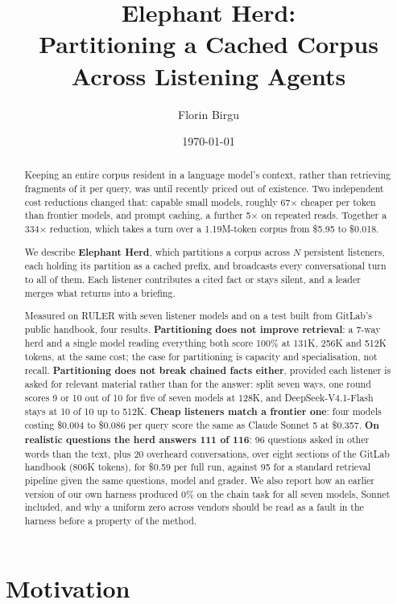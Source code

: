 \documentclass[11pt]{article}
\title{Elephant Herd:\\
Partitioning a Cached Corpus Across Listening Agents}
\author{Florin Birgu}
\date{\today}
\begin{document}
\maketitle

\begin{abstract}
Keeping an entire corpus resident in a language model's context, rather than
retrieving fragments of it per query, was until recently priced out of existence. Two
independent cost reductions changed that: capable small models, roughly 67$\times$
cheaper per token than frontier models, and prompt caching, a further 5$\times$ on
repeated reads. Together a 334$\times$ reduction, which takes a turn over a
1.19M-token corpus from \$5.95 to \$0.018.

We describe \textbf{Elephant Herd}, which partitions a corpus across $N$ persistent
listeners, each holding its partition as a cached prefix, and broadcasts every
conversational turn to all of them. Each listener contributes a cited fact or stays
silent, and a leader merges what returns into a briefing.

Measured on RULER with seven listener models and on a test built from GitLab's public
handbook, four results. \textbf{Partitioning does not improve retrieval}: a 7-way herd
and a single model reading everything both score 100\% at 131K, 256K and 512K tokens,
at the same cost; the case for partitioning is capacity and specialisation, not recall.
\textbf{Partitioning does not break chained facts either}, provided each listener is
asked for relevant material rather than for the answer: split seven ways, one round
scores 9 or 10 out of 10 for five of seven models at 128K, and DeepSeek-V4.1-Flash stays
at 10 of 10 up to 512K. \textbf{Cheap listeners match a frontier one}: four models
costing \$0.004 to \$0.086 per query score the same as Claude Sonnet 5 at \$0.357.
\textbf{On realistic questions the herd answers 111 of 116}: 96 questions asked in
other words than the text, plus 20 overheard conversations, over eight sections of the
GitLab handbook (806K tokens), for \$0.59 per full run, against 95 for a standard
retrieval pipeline given the same questions, model and grader. We also report how an earlier
version of our own harness produced 0\% on the chain task for all seven models, Sonnet
included, and why a uniform zero across vendors should be read as a fault in the harness
before a property of the method.
\end{abstract}

\section{Motivation}
\end{document}
